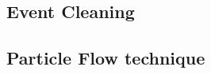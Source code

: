  \subsection{Event Cleaning \label{sec:event_cleaning}}
% 
% 
% 
% 


\subsection{Particle Flow technique \label{sec:event_reco_pf}}

